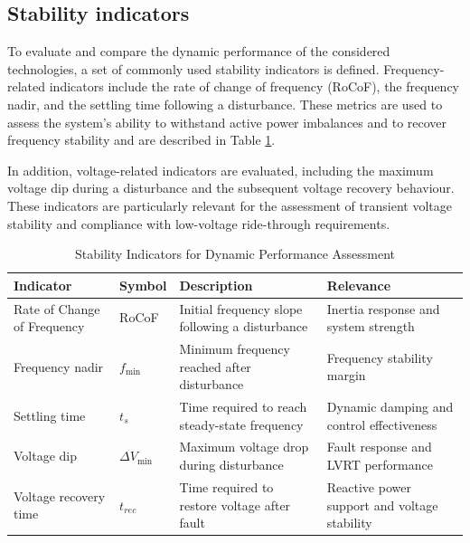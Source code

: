 \subsection{Stability indicators}


To evaluate and compare the dynamic performance of the considered technologies, a set of commonly used stability indicators is defined. Frequency-related indicators include the rate of change of frequency (RoCoF), the frequency nadir, and the settling time following a disturbance. These metrics are used to assess the system's ability to withstand active power imbalances and to recover frequency stability and are described in Table \ref{tab:stability_indicators}.

In addition, voltage-related indicators are evaluated, including the maximum voltage dip during a disturbance and the subsequent voltage recovery behaviour. These indicators are particularly relevant for the assessment of transient voltage stability and compliance with low-voltage ride-through requirements.

\begin{table}[htbp!]
    \centering
    \caption{Stability Indicators for Dynamic Performance Assessment}
    \label{tab:stability_indicators}
    \begin{tabularx}{\textwidth}{l l X X}
    \toprule
    \textbf{Indicator} & \textbf{Symbol} & \textbf{Description} & \textbf{Relevance} \\
    \midrule
    Rate of Change of Frequency & RoCoF & Initial frequency slope following a disturbance & Inertia response and system strength \\
    Frequency nadir & $f_{\min}$ & Minimum frequency reached after disturbance & Frequency stability margin \\
    Settling time & $t_s$ & Time required to reach steady-state frequency & Dynamic damping and control effectiveness \\
    
    Voltage dip & $\Delta V_{\min}$ & Maximum voltage drop during disturbance & Fault response and LVRT performance \\
    Voltage recovery time & $t_{rec}$ & Time required to restore voltage after fault & Reactive power support and voltage stability \\
    \bottomrule
    \end{tabularx}
    \end{table}




